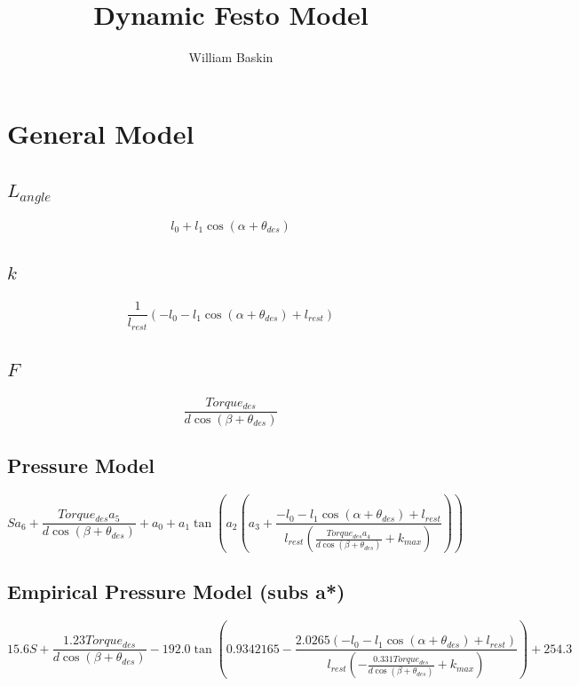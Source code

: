 \documentclass[12pt, letterpaper, oneside, notitlepage, onecolumn]{article}
\author{William Baskin}
\title{Dynamic Festo Model}
\begin{document}
\maketitle

\section{General Model}

\subsection{$L_{angle}$}
\begin{equation}
l_{0} + l_{1} \cos{\left (\alpha + \theta_{des} \right )}
\end{equation}

\subsection{$k$}
\begin{equation}
\frac{1}{l_{rest}} \left(- l_{0} - l_{1} \cos{\left (\alpha + \theta_{des}
\right )} + l_{rest}\right)
\end{equation}

\subsection{$F$}
\begin{equation}
\frac{Torque_{des}}{d \cos{\left (\beta + \theta_{des} \right )}}
\end{equation}

\subsection{Pressure Model}
\begin{equation}
S a_{6} + \frac{Torque_{des} a_{5}}{d \cos{\left (\beta + \theta_{des} \right
)}} + a_{0} + a_{1} \tan{\left (a_{2} \left(a_{3} + \frac{- l_{0} - l_{1}
\cos{\left (\alpha + \theta_{des} \right )} + l_{rest}}{l_{rest}
\left(\frac{Torque_{des} a_{4}}{d \cos{\left (\beta + \theta_{des} \right )}} +
k_{max}\right)}\right) \right )}
\end{equation}

\subsection{Empirical Pressure Model (subs a*)}
\begin{equation}
15.6 S + \frac{1.23 Torque_{des}}{d \cos{\left (\beta + \theta_{des} \right )}}
- 192.0 \tan{\left (0.9342165 - \frac{2.0265 \left(- l_{0} - l_{1} \cos{\left
  (\alpha + \theta_{des} \right )} + l_{rest}\right)}{l_{rest} \left(-
  \frac{0.331 Torque_{des}}{d \cos{\left (\beta + \theta_{des} \right )}} +
  k_{max}\right)} \right )} + 254.3
  \end{equation}
\end{document}

